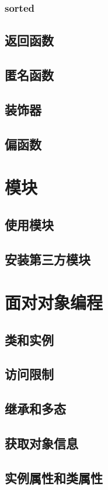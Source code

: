 \subsubsection{sorted}
\subsection{返回函数}
\subsection{匿名函数}
\subsection{装饰器}
\subsection{偏函数}

\newpage
\section{模块}
\subsection{使用模块}
\subsection{安装第三方模块}

\newpage
\section{面对对象编程}
\subsection{类和实例}
\subsection{访问限制}
\subsection{继承和多态}
\subsection{获取对象信息}
\subsection{实例属性和类属性}


